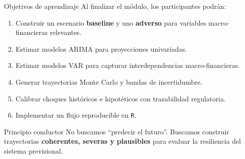 \documentclass[10pt,aspectratio=169]{beamer}
\newcommand{\baseline}{\textcolor{MacropolTeal}{\textbf{baseline}}}
\newcommand{\adverso}{\textcolor{red!70!black}{\textbf{adverso}}}
\newcommand{\R}{\texttt{R}}
\begin{document}
\begin{frame}{Objetivos de aprendizaje}
Al finalizar el módulo, los participantes podrán:

\begin{enumerate}
  \item Construir un escenario \baseline{} y uno \adverso{} para variables macro-financieras relevantes.
  \item Estimar modelos ARIMA para proyecciones univariadas.
  \item Estimar modelos VAR para capturar interdependencias macro-financieras.
  \item Generar trayectorias Monte Carlo y bandas de incertidumbre.
  \item Calibrar choques históricos e hipotéticos con trazabilidad regulatoria.
  \item Implementar un flujo reproducible en \R{}.
\end{enumerate}

\vspace{0.4em}
\begin{block}{Principio conductor}
No buscamos ``predecir el futuro''. Buscamos construir trayectorias \textbf{coherentes, severas y plausibles} para evaluar la resiliencia del sistema previsional.
\end{block}
\end{frame}
\end{document}
